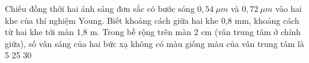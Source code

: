\begin{vidu}%
Chiếu đồng thời hai ánh sáng đơn sắc có bước sóng $0,54\ \mu m$ và $0,72\ \mu m$ vào hai khe của thí nghiệm Young. Biết khoảng cách giữa hai khe 0,8 mm, khoảng cách từ hai khe tới màn 1,8 m. Trong bề rộng trên màn 2  cm (vân trung tâm ở chính giữa), số vân sáng của hai bức xạ không có màu giống màu của vân trung tâm là
\choice
{}
{5}
{25}
{30}
\end{vidu} 
 
